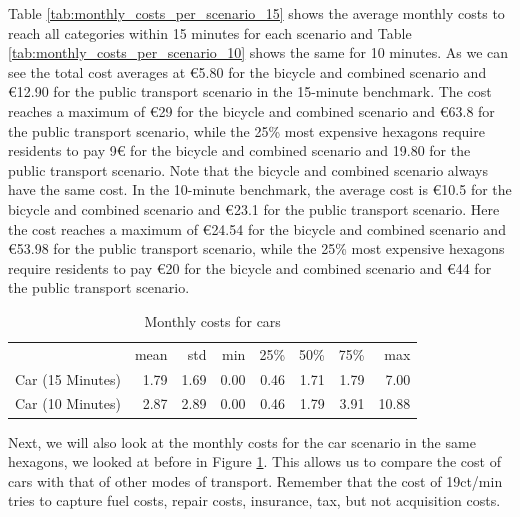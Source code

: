 Table \ref{tab:monthly_costs_per_scenario_15} shows the average monthly costs to reach all categories within 15 minutes for each scenario and Table \ref{tab:monthly_costs_per_scenario_10} shows the same for 10 minutes.
As we can see the total cost averages at \euro{5.80} for the bicycle and combined scenario and \euro{12.90} for the public transport scenario in the 15-minute benchmark.
The cost reaches a maximum of \euro{29} for the bicycle and combined scenario and \euro{63.8} for the public transport scenario, while the 25\% most expensive hexagons require residents to pay 9\euro{} for the bicycle and combined scenario and 19.80 for the public transport scenario.
Note that the bicycle and combined scenario always have the same cost.
In the 10-minute benchmark, the average cost is \euro{10.5} for the bicycle and combined scenario and \euro{23.1} for the public transport scenario.
Here the cost reaches a maximum of \euro{24.54} for the bicycle and combined scenario and \euro{53.98} for the public transport scenario, while the 25\% most expensive hexagons require residents to pay \euro{20} for the bicycle and combined scenario and \euro{44} for the public transport scenario.

\begin{table}
  \caption{Monthly costs for cars}
  \label{tab:monthly_costs_for_cars}
  \begin{center}
    \begin{tabular}{lrrrrrrr}
     & mean & std & min & 25\% & 50\% & 75\% & max \\
    Car (15 Minutes) & 1.79 & 1.69 & 0.00 & 0.46 & 1.71 & 1.79 & 7.00 \\
    Car (10 Minutes) & 2.87 & 2.89 & 0.00 & 0.46 & 1.79 & 3.91 & 10.88 \\
    \end{tabular}
  \end{center}
\end{table}

Next, we will also look at the monthly costs for the car scenario in the same hexagons, we looked at before in Figure \ref{tab:monthly_costs_for_cars}.
This allows us to compare the cost of cars with that of other modes of transport.
Remember that the cost of 19ct/min tries to capture fuel costs, repair costs, insurance, tax, but not acquisition costs.
